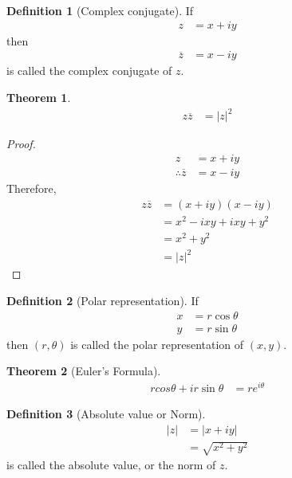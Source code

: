 \documentclass[titlepage, fleqn, a4paper, 12pt, twoside]{article}
\theoremstyle{definition}
\newtheorem{definition}{Definition}
\theoremstyle{theorem}
\newtheorem{theorem}{Theorem}
\begin{document}
\begin{definition}[Complex conjugate]
	If
	\begin{align*}
		z & = x + i y
	\end{align*}
	then
	\begin{align*}
		\overline{z} & = x - i y
	\end{align*}
	is called the complex conjugate of $z$.
\end{definition}

\begin{theorem}
	\begin{align*}
		z \overline{z} & = |z|^2
	\end{align*}
\end{theorem}

\begin{proof}
	\begin{align*}
		z                       & = x + i y \\
		\therefore \overline{z} & = x - i y
	\end{align*}
	Therefore,
	\begin{align*}
		z \overline{z} & = (x + i y) (x - i y)       \\
                               & = x^2 - i x y + i x y + y^2 \\
                               & = x^2 + y^2                 \\
                               & = |z|^2
	\end{align*}
\end{proof}

\begin{definition}[Polar representation]
	If
	\begin{align*}
		x & = r \cos \theta \\
		y & = r \sin \theta
	\end{align*}
	then $(r,\theta)$ is called the polar representation of $(x,y)$.
\end{definition}

\begin{theorem}[Euler's Formula]
	\begin{align*}
		r cos \theta + i r \sin \theta & = r e^{i \theta}
	\end{align*}
	\label{Euler's_Formula}
\end{theorem}

\begin{definition}[Absolute value or Norm]
	\begin{align*}
		|z| & = |x + i y| \\
                    & = \sqrt{x^2 + y^2}
	\end{align*}
	is called the absolute value, or the norm of $z$.
\end{definition}
\end{document}
